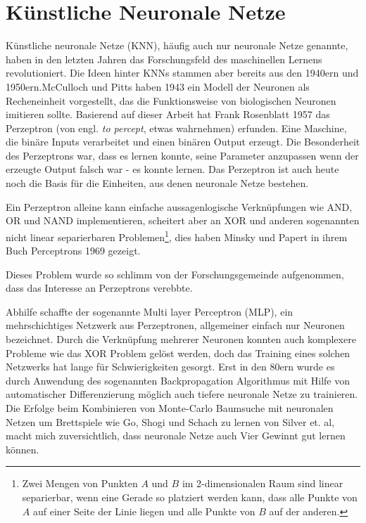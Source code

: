 \section{Künstliche Neuronale Netze}

Künstliche neuronale Netze (KNN), häufig auch nur neuronale Netze genannte, haben in den letzten Jahren das Forschungsfeld des maschinellen Lernens revolutioniert. Die Ideen hinter KNNs stammen aber bereits aus den 1940ern und 1950ern.McCulloch und Pitts haben 1943 ein Modell der Neuronen als Recheneinheit vorgestellt, das die Funktionsweise von biologischen Neuronen imitieren sollte. Basierend auf dieser Arbeit hat Frank Rosenblatt 1957 das Perzeptron (von engl. \textit{to percept}, etwas wahrnehmen) erfunden. Eine Maschine, die binäre Inputs verarbeitet und einen binären Output erzeugt. Die Besonderheit des Perzeptrons war, dass es lernen konnte, seine Parameter anzupassen wenn der erzeugte Output falsch war - es konnte lernen. Das Perzeptron ist auch heute noch die Basis für die Einheiten, aus denen neuronale Netze bestehen.
\par 
Ein Perzeptron alleine kann einfache aussagenlogische Verknüpfungen wie AND, OR und NAND implementieren, scheitert aber an XOR und anderen sogenannten nicht linear separierbaren Problemen\footnote{Zwei Mengen von Punkten $A$ und $B$ im 2-dimensionalen Raum sind linear separierbar, wenn eine Gerade so platziert werden kann, dass alle Punkte von $A$ auf einer Seite der Linie liegen und alle Punkte von $B$ auf der anderen.}, dies haben Minsky und Papert in ihrem Buch Perceptrons 1969 gezeigt.

Dieses Problem wurde so schlimm von der Forschungsgemeinde aufgenommen, dass das Interesse an Perzeptrons verebbte.

Abhilfe schaffte der sogenannte Multi layer Perceptron (MLP), ein mehrschichtiges Netzwerk aus Perzeptronen, allgemeiner einfach nur Neuronen bezeichnet. Durch die Verknüpfung mehrerer Neuronen konnten auch komplexere Probleme wie das XOR Problem gelöst werden, doch das Training eines solchen Netzwerks hat lange für Schwierigkeiten gesorgt. Erst in den 80ern wurde es durch Anwendung des sogenannten Backpropagation Algorithmus mit Hilfe von automatischer Differenzierung möglich auch tiefere neuronale Netze zu trainieren.\\

Die Erfolge beim Kombinieren von Monte-Carlo Baumsuche mit neuronalen Netzen um Brettspiele wie Go, Shogi und Schach zu lernen von Silver et. al\cite{silverMastering}, macht mich zuversichtlich, dass neuronale Netze auch Vier Gewinnt gut lernen können.

